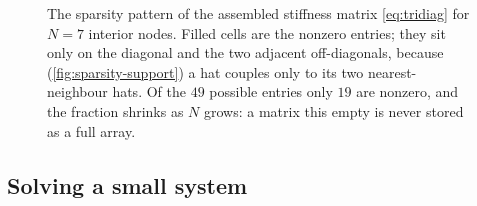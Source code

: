 \begin{figure}[t]
\centering
{}
\caption[Tridiagonal sparsity pattern]{The sparsity pattern of the assembled
stiffness matrix \cref{eq:tridiag} for $N=7$ interior nodes. Filled cells are the
nonzero entries; they sit only on the diagonal and the two adjacent off-diagonals,
because (\cref{fig:sparsity-support}) a hat couples only to its two
nearest-neighbour hats. Of the $49$ possible entries only $19$ are nonzero, and
the fraction shrinks as $N$ grows: a matrix this empty is never stored as a full
array.}
\label{fig:sparsity-grid}
\end{figure}

\subsection{Solving a small system}

